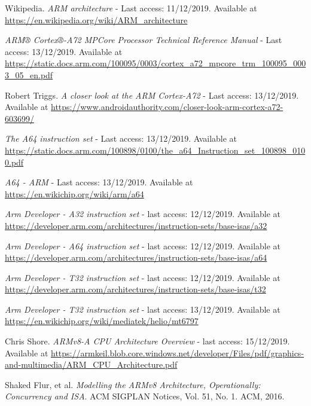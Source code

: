\documentclass[12pt]{article}
\begin{document}
\newpage
\begin{thebibliography}{9}
Wikipedia.
\textit{ARM architecture} - Last access: 11/12/2019. Available at \url{https://en.wikipedia.org/wiki/ARM_architecture} 

\textit{ARM® Cortex®-A72 MPCore Processor Technical Reference Manual} - Last access: 13/12/2019. Available at \url{https://static.docs.arm.com/100095/0003/cortex_a72_mpcore_trm_100095_0003_05_en.pdf}
 
Robert Triggs. \textit{A closer look at the ARM Cortex-A72} - Last access: 13/12/2019. Available at \url{https://www.androidauthority.com/closer-look-arm-cortex-a72-603699/}

\textit{The A64 instruction set} - Last access: 13/12/2019. Available at \url{https://static.docs.arm.com/100898/0100/the_a64_Instruction_set_100898_0100.pdf}

\textit{A64 - ARM} - Last access: 13/12/2019. Available at \url{https://en.wikichip.org/wiki/arm/a64}

\textit{Arm Developer - A32 instruction set} - last access: 12/12/2019. Available at \url{https://developer.arm.com/architectures/instruction-sets/base-isas/a32}

\textit{Arm Developer - A64 instruction set} - last access: 12/12/2019. Available at \url{https://developer.arm.com/architectures/instruction-sets/base-isas/a64}

\textit{Arm Developer - T32 instruction set} - last access: 12/12/2019. Available at \url{https://developer.arm.com/architectures/instruction-sets/base-isas/t32}


\textit{Arm Developer - T32 instruction set} - last access: 13/12/2019. Available at \url{https://en.wikichip.org/wiki/mediatek/helio/mt6797}

Chris Shore. \textit{ARMv8-A CPU Architecture Overview} - last access: 15/12/2019. Available at \url{https://armkeil.blob.core.windows.net/developer/Files/pdf/graphics-and-multimedia/ARM_CPU_Architecture.pdf}

Shaked Flur, et al. \textit{Modelling the ARMv8 Architecture, Operationally: Concurrency and ISA}. ACM SIGPLAN Notices, Vol. 51, No. 1. ACM, 2016.

\end{thebibliography}
\end{document}
